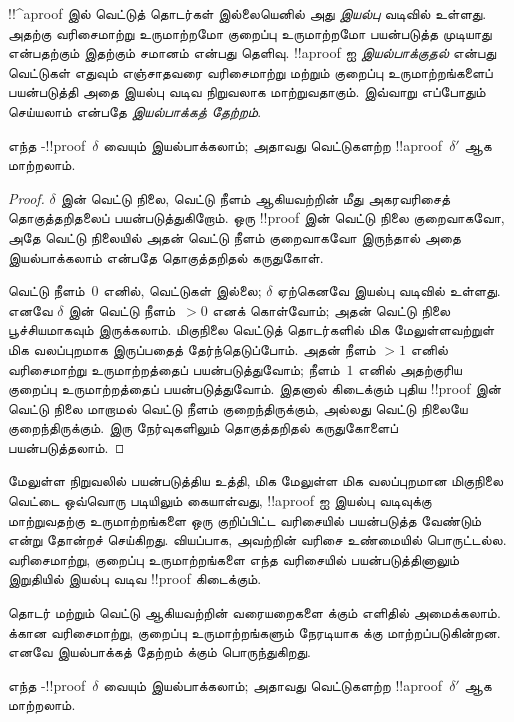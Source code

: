 \documentclass[../../../include/open-logic-section]{subfiles}
\begin{document}


!!^a{proof} இல் வெட்டுத் தொடர்கள் இல்லையெனில் அது
\emph{இயல்பு} வடிவில் உள்ளது. அதற்கு வரிசைமாற்று
உருமாற்றமோ குறைப்பு உருமாற்றமோ பயன்படுத்த முடியாது
என்பதற்கும் இதற்கும் சமானம் என்பது தெளிவு.
!!a{proof} ஐ \emph{இயல்பாக்குதல்} என்பது வெட்டுகள்
எதுவும் எஞ்சாதவரை வரிசைமாற்று மற்றும் குறைப்பு
உருமாற்றங்களைப் பயன்படுத்தி அதை இயல்பு வடிவ நிறுவலாக
மாற்றுவதாகும். இவ்வாறு எப்போதும் செய்யலாம் என்பதே
\emph{இயல்பாக்கத் தேற்றம்}.

\begin{thm}
எந்த -!!{proof}~$\delta$ வையும் இயல்பாக்கலாம்;
அதாவது வெட்டுகளற்ற !!a{proof}~$\delta'$ ஆக மாற்றலாம்.
\end{thm}

\begin{proof}
  $\delta$ இன் வெட்டு நிலை, வெட்டு நீளம் ஆகியவற்றின்
  மீது அகரவரிசைத் தொகுத்தறிதலைப் பயன்படுத்துகிறோம்.
  ஒரு !!{proof} இன் வெட்டு நிலை குறைவாகவோ, அதே வெட்டு
  நிலையில் அதன் வெட்டு நீளம் குறைவாகவோ இருந்தால் அதை
  இயல்பாக்கலாம் என்பதே தொகுத்தறிதல் கருதுகோள்.

  வெட்டு நீளம்~$0$ எனில், வெட்டுகள் இல்லை; $\delta$
  ஏற்கெனவே இயல்பு வடிவில் உள்ளது. எனவே $\delta$ இன்
  வெட்டு நீளம்~$> 0$ எனக் கொள்வோம்; அதன் வெட்டு நிலை
  பூச்சியமாகவும் இருக்கலாம். மிகுநிலை வெட்டுத்
  தொடர்களில் மிக மேலுள்ளவற்றுள் மிக வலப்புறமாக இருப்பதைத்
  தேர்ந்தெடுப்போம். அதன் நீளம் $>1$ எனில் வரிசைமாற்று
  உருமாற்றத்தைப் பயன்படுத்துவோம்; நீளம்~$1$ எனில் அதற்குரிய
  குறைப்பு உருமாற்றத்தைப் பயன்படுத்துவோம். இதனால் கிடைக்கும்
  புதிய !!{proof} இன் வெட்டு நிலை மாறாமல் வெட்டு நீளம்
  குறைந்திருக்கும், அல்லது வெட்டு நிலையே குறைந்திருக்கும்.
  இரு நேர்வுகளிலும் தொகுத்தறிதல் கருதுகோளைப் பயன்படுத்தலாம்.
\end{proof}

மேலுள்ள நிறுவலில் பயன்படுத்திய உத்தி, மிக மேலுள்ள
மிக வலப்புறமான மிகுநிலை வெட்டை ஒவ்வொரு படியிலும்
கையாள்வது, !!a{proof} ஐ இயல்பு வடிவுக்கு மாற்றுவதற்கு
உருமாற்றங்களை ஒரு குறிப்பிட்ட வரிசையில் பயன்படுத்த வேண்டும்
என்று தோன்றச் செய்கிறது. வியப்பாக, அவற்றின் வரிசை
உண்மையில் பொருட்டல்ல. வரிசைமாற்று, குறைப்பு
உருமாற்றங்களை எந்த வரிசையில் பயன்படுத்தினாலும் இறுதியில்
இயல்பு வடிவ !!{proof} கிடைக்கும்.

தொடர் மற்றும் வெட்டு ஆகியவற்றின் வரையறைகளை
 க்கும் எளிதில் அமைக்கலாம்.  க்கான
வரிசைமாற்று, குறைப்பு உருமாற்றங்களும் நேரடியாக
 க்கு மாற்றப்படுகின்றன. எனவே இயல்பாக்கத்
தேற்றம்  க்கும் பொருந்துகிறது.

\begin{thm}
எந்த -!!{proof}~$\delta$ வையும் இயல்பாக்கலாம்;
அதாவது வெட்டுகளற்ற !!a{proof}~$\delta'$ ஆக மாற்றலாம்.
\end{thm}
\end{document}
